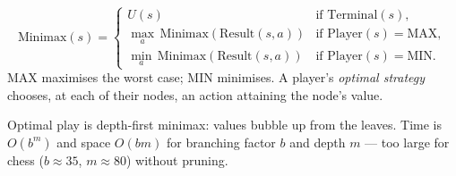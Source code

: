 \begin{definition}
\[
\text{Minimax}(s)=\begin{cases}
U(s) & \text{if }\text{Terminal}(s),\\
\max_{a}\,\text{Minimax}(\text{Result}(s,a)) & \text{if Player}(s)=\text{MAX},\\
\min_{a}\,\text{Minimax}(\text{Result}(s,a)) & \text{if Player}(s)=\text{MIN}.
\end{cases}
\]
MAX maximises the worst case; MIN minimises. A player's \emph{optimal strategy} chooses, at each of their nodes, an action attaining the node's value.
\end{definition}

Optimal play is depth-first minimax: values bubble up from the leaves. Time is $O(b^{m})$ and space $O(bm)$ for branching factor $b$ and depth $m$ --- too large for chess ($b\!\approx\!35$, $m\!\approx\!80$) without pruning.

